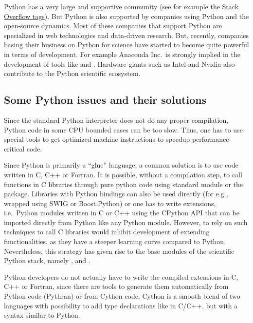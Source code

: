 Python has a very large and supportive community (see for example
the \href{http://stackoverflow.com/tags}{Stack Overflow tags}).
%
But Python is also supported by companies using Python and the open-source
dynamics.  Most of these companies that support Python are specialized in
web technologies and data-driven research.  But, recently, companies basing
their business
on Python for science have started to become quite powerful in terms of
development. For example Anaconda Inc.\ is strongly implied in the development of
tools like  and . Hardware giants such as Intel and Nvidia
also contribute to the Python scientific ecosystem.


\subsection{Some Python issues and their solutions}

Since the standard Python interpreter does not do any proper
compilation, Python code in some CPU bounded cases can be too slow. Thus, one
has to use special tools to get optimized machine instructions to speedup
performance-critical code.

  Since Python is primarily a ``glue''
language, a common solution is to use code written in C, C++ or Fortran.
%
It is possible, without a compilation step, to call functions in C libraries
through pure python code using  standard module or the 
package.
%
Libraries with Python bindings can also be used directly (for e.g., wrapped
using SWIG or Boost.Python) or one has to write extensions, i.e.\ Python
modules written in C or C++ using the CPython API that can be imported directly
from Python like any Python module.
%
However, to rely on such techniques to call C libraries would inhibit
development of extending functionalities, as they have a steeper learning
curve compared to Python.
%
Nevertheless, this strategy has given rise to the base modules of the scientific
Python stack, namely \Numpy, \Scipy and .

Python developers do not actually have to write the compiled extensions in C,
C++ or Fortran, since there are tools to generate them automatically from
Python code (Pythran) or from Cython code. Cython \citep{behnel_cython2011} is a
smooth blend of two languages with possibility to add type declarations like in
C/C++, but with a syntax similar to Python.

